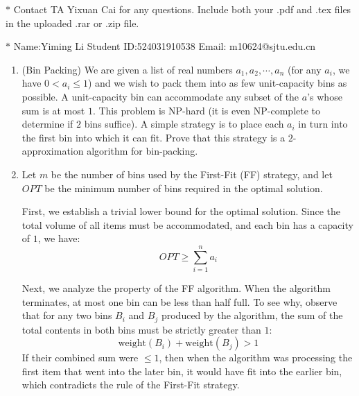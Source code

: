 \documentclass[12pt,a4paper]{article}
\makeatletter
\newtheorem*{solution}{Solution}
\theoremstyle{definition}
\renewenvironment{solution}[1][Solution] {\par\pushQED{\qed}\normalfont\topsep6\p@\@plus6\p@\relax\trivlist\item[\hskip\labelsep\bfseries#1\@addpunct{.}]\ignorespaces}{\popQED\endtrivlist\@endpefalse} \makeatother
\makeatother
\begin{document}
\noindent

\noindent{}
\begin{center}
\footnotesize{\color{red}$*$ Contact TA Yixuan Cai for any questions. Include both your .pdf and .tex files in the uploaded .rar or .zip file.}

\footnotesize{\color{blue}$*$ Name:Yiming Li  \quad Student ID:524031910538 \quad Email: m10624@sjtu.edu.cn}
\end{center}

\begin{enumerate}
  \item {\color{purple}(Bin Packing)} We are given a list of real numbers $a_1, a_2, \cdots , a_n$ (for any $a_i$, we have $0 < a_i\leq 1$) and we wish to pack them into as few unit-capacity bins as possible. A unit-capacity bin can accommodate any subset of the $a$’s whose sum is at most $1$. This problem is NP-hard (it is even NP-complete to determine if $2$ bins suffice). A simple strategy is to place each $a_i$ in turn into the first bin into which it can fit. Prove that this strategy is a $2$-approximation algorithm for bin-packing.

  \begin{solution}
  Let $m$ be the number of bins used by the First-Fit (FF) strategy, and let $OPT$ be the minimum number of bins required in the optimal solution.

  First, we establish a trivial lower bound for the optimal solution. Since the total volume of all items must be accommodated, and each bin has a capacity of $1$, we have:
  \[
  OPT \ge \sum_{i=1}^n a_i
  \]
  
  Next, we analyze the property of the FF algorithm. When the algorithm terminates, at most one bin can be less than half full. To see why, observe that for any two bins $B_i$ and $B_j$ produced by the algorithm, the sum of the total contents in both bins must be strictly greater than $1$:
  \[
  \text{weight}(B_i) + \text{weight}(B_j) > 1
  \]
  If their combined sum were $\le 1$, then when the algorithm was processing the first item that went into the later bin, it would have fit into the earlier bin, which contradicts the rule of the First-Fit strategy.


\end{solution}
\end{enumerate}
\end{document}
